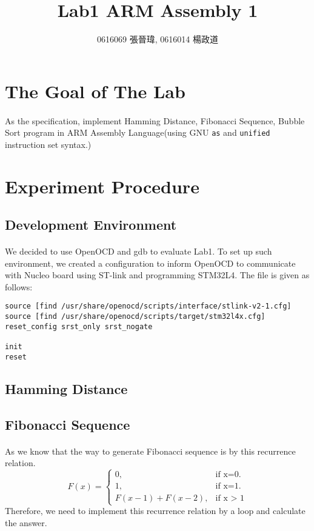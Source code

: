 \title{Lab1 ARM Assembly 1}
\author{0616069 張晉瑋, 0616014 楊政道}
\maketitle
\thispagestyle{fancy}
\section{The Goal of The Lab}
\paragraph{}
As the specification, implement Hamming Distance, Fibonacci Sequence, Bubble Sort program in ARM Assembly Language(using GNU \texttt{as} and \texttt{unified} instruction set syntax.)
\section{Experiment Procedure}
\subsection{Development Environment}
\paragraph{}
We decided to use OpenOCD and gdb to evaluate Lab1.
To set up such environment, we created a configuration to inform OpenOCD to communicate with Nucleo board using ST-link and programming STM32L4.
The file is given as follows:
\begin{lstlisting}
source [find /usr/share/openocd/scripts/interface/stlink-v2-1.cfg]
source [find /usr/share/openocd/scripts/target/stm32l4x.cfg]
reset_config srst_only srst_nogate

init
reset
\end{lstlisting}
\subsection{Hamming Distance}
\paragraph{}
\subsection{Fibonacci Sequence}
\paragraph{}
As we know that the way to generate Fibonacci sequence is by this recurrence relation.
\begin{equation}
  F(x)=\begin{cases}
    0, & \text{if x=0}.\\
    1, & \text{if x=1}.\\
    F(x - 1) + F(x - 2), & \text{if x > 1}
  \end{cases}
\end{equation}
Therefore, we need to implement this recurrence relation by a loop and calculate the answer.
